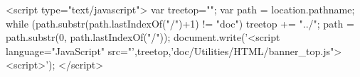 %
%
%
%
%

%
%
% 
%
%
\begin{rawhtml}
<script type="text/javascript">
var treetop="";
var path = location.pathname;
while (path.substr(path.lastIndexOf("/")+1) != "doc") {
  treetop += "../";
  path = path.substr(0, path.lastIndexOf("/"));
}
document.write('<script language="JavaScript" src="',treetop,'doc/Utilities/HTML/banner_top.js"><\/script>');
</script>
\end{rawhtml}
